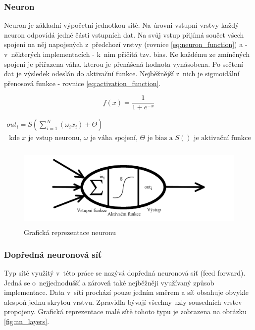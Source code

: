 \subsubsection{Neuron}
Neuron je základní výpočetní jednotkou sítě. Na úrovni vstupní vrstvy každý neuron odpovídá jedné části vstupních dat. Na svůj vstup přijímá součet všech spojení na něj napojených z~předchozí vrstvy (rovnice \ref{eq:neuron_function}) a - v~některých implementacích - k~nim přičítá tzv. bias. Ke každému ze zmíněných spojení je přiřazena váha, kterou je přenášená hodnota vynásobena. Po sečtení dat je výsledek odeslán do aktivační funkce. Nejběžnější z~nich je sigmoidální přenosová funkce - rovnice \ref{eq:activation_function}.

\begin{equation}
	f(x)=\frac{1}{1+e^{-x}}
    \label{eq:activation_function}
\end{equation}

\begin{equation} \label{eq:neuron_function}
\begin{gathered}
out_i=S(\sum_{i=1}^{N}(\omega_ix_i) + \Theta) \\
\text{ kde $x$ je vstup neuronu, $\omega$ je váha spojení, $\Theta$ je bias a $S()$ je aktivační funkce }
\end{gathered}
\end{equation}
\begin{figure}[H]
	\centering
		\includegraphics[height=4cm]{obrazky-figures/nn_neuron.png}
        \caption{Grafická reprezentace neuronu}
\end{figure}
\subsubsection{Dopředná neuronová síť}
Typ sítě využitý v~této práce se nazývá dopředná neuronová síť (feed forward). Jedná se o~nejjednodušší a zároveň také nejběžněji využívaný způsob implementace. Data v~síti prochází pouze jedním směrem a síť obsahuje obvykle alespoň jednu skrytou vrstvu. Zpravidla bývají všechny uzly sousedních vrstev propojeny. Grafická reprezentace malé sítě tohoto typu je zobrazena na obrázku \ref{fig:nn_layers}.

